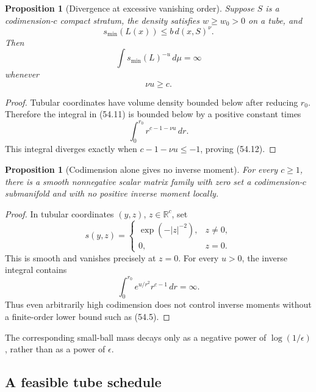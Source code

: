 \documentclass[11pt]{article}
\newtheorem{proposition}[theorem]{Proposition}
\begin{document}
\begin{proposition}[Divergence at excessive vanishing order]
\label{prop:v11v54-divergence}
Suppose \(S\) is a codimension-\(c\) compact stratum, the density
satisfies \(w\ge w_0>0\) on a tube, and
\[
                         s_{\min}(L(x))
                              \le b\,d(x,S)^\nu.               \tag{54.10}
\]
Then
\[
                         \int s_{\min}(L)^{-u}\,d\mu=\infty   \tag{54.11}
\]
whenever
\[
                               \nu u\ge c.                     \tag{54.12}
\]
\end{proposition}

\begin{proof}
Tubular coordinates have volume density bounded below after reducing
\(r_0\).  Therefore the integral in (54.11) is bounded below by a
positive constant times
\[
                         \int_0^{r_0}r^{c-1-\nu u}\,dr.
\]
This integral diverges exactly when \(c-1-\nu u\le-1\), proving
(54.12).
\end{proof}

\begin{proposition}[Codimension alone gives no inverse moment]
\label{prop:v11v54-flat}
For every \(c\ge1\), there is a smooth nonnegative scalar matrix family
with zero set a codimension-\(c\) submanifold and with no positive
inverse moment locally.
\end{proposition}

\begin{proof}
In tubular coordinates \((y,z)\), \(z\in\mathbb R^c\), set
\[
 s(y,z)=
 \begin{cases}
 \exp(-|z|^{-2}),&z\ne0,\\
 0,&z=0.
 \end{cases}                                                   \tag{54.13}
\]
This is smooth and vanishes precisely at \(z=0\).  For every \(u>0\),
the inverse integral contains
\[
                    \int_0^{r_0}e^{u/r^2}r^{c-1}\,dr=\infty. \tag{54.14}
\]
Thus even arbitrarily high codimension does not control inverse
moments without a finite-order lower bound such as (54.5).
\end{proof}

The corresponding small-ball mass decays only as a negative power of
\(\log(1/\epsilon)\), rather than as a power of \(\epsilon\).

\subsection{A feasible tube schedule}
\end{document}
